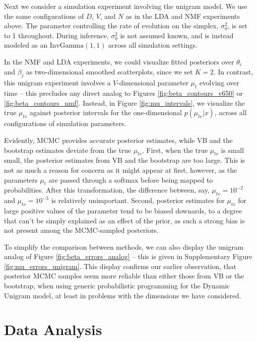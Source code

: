 \documentclass{article}
\begin{document}
Next we consider a simulation experiment involving the unigram model. We use the
same configurations of $D$, $V$, and $N$ as in the LDA and NMF experiments
above. The parameter controlling the rate of evolution on the simplex,
$\sigma_{0}^2$, is set to 1 throughout. During inference, $\sigma_0^2$ is not
assumed known, and is instead modeled as an $\text{InvGamma}\left(1, 1\right)$
across all simulation settings.

In the NMF and LDA experiments, we could visualize fitted posteriors over
$\theta_i$ and $\beta_j$ as two-dimensional smoothed scatterplots, since we set
$K = 2$. In contrast, this unigram experiment involves a $V$-dimensional
parameter $\mu_t$ evolving over time -- this precludes any direct analog to
Figures \ref{fig:beta_contours_v650} or \ref{fig:beta_contours_nmf}. Instead, in
Figure \ref{fig:mu_intervals}, we visualize the true $\mu_{tv}$ against
posterior intervals for the one-dimensional $p\left(\mu_{tv} \vert x\right)$,
across all configurations of simulation parameters.

Evidently, MCMC provides accurate posterior estimates, while VB and the
bootstrap estimates deviate from the true $\mu_{tv}$. First, when the true
$\mu_{tv}$ is small small, the posterior estimates from VB and the bootstrap are
too large. This is not as much a reason for concern as it might appear at first,
however, as the parameters $\mu_t$ are passed through a softmax before being
mapped to probabilities. After this transformation, the difference between, say,
$\mu_{tv} = 10^{-2}$ and $\mu_{tv} = 10^{-5}$ is relatively unimportant. Second,
posterior estimates for $\mu_{tv}$ for large positive values of the parameter
tend to be biased downards, to a degree that can't be simply explained as an
effect of the prior, as such a strong bias is not present among the MCMC-sampled
posteriors.

To simplify the comparison between methods, we can also display the unigram
analog of Figure \ref{fig:beta_errors_analog} -- this is given in Supplementary
Figure \ref{fig:mu_errors_unigram}. This display confirms our earlier
observation, that posterior MCMC samples seem more reliable than either those
from VB or the bootstrap, when using generic probabilistic programming for the
Dynamic Unigram model, at least in problems with the dimensions we have
considered.

\section{Data Analysis}
\label{sec:data_analysis}
\end{document}

